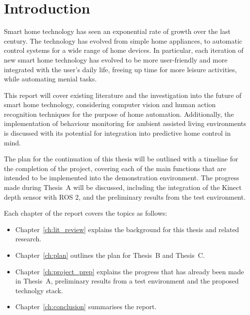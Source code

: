 \chapter{Introduction}\label{ch:intro}

Smart home technology has seen an exponential rate of growth over the last century.
The technology has evolved from simple home appliances, to automatic control systems for a wide range of home devices.
In particular, each iteration of new smart home technology has evolved to be more user-friendly and more integrated with the user's daily life, freeing up time for more leisure activities, while automating menial tasks.

This report will cover existing literature and the investigation into the future of smart home technology, considering computer vision and human action recognition techniques for the purpose of home automation.
Additionally, the implementation of behaviour monitoring for ambient assisted living environments is discussed with its potential for integration into predictive home control in mind.

The plan for the continuation of this thesis will be outlined with a timeline for the completion of the project, covering each of the main functions that are intended to be implemented into the demonstration environment.
The progress made during Thesis~A will be discussed, including the integration of the Kinect depth sensor with ROS 2, and the preliminary results from the test environment.

\newpage

Each chapter of the report covers the topics as follows:
\begin{itemize}
    \item Chapter~\ref{ch:lit_review} explains the background for this thesis and related research.
    \item Chapter~\ref{ch:plan} outlines the plan for Thesis~B and Thesis~C.
    \item Chapter~\ref{ch:project_prep} explains the progress that has already been made in Thesis~A, preliminary results from a test environment and the proposed technolgy stack.
    \item Chapter~\ref{ch:conclusion} summarises the report.
\end{itemize}
